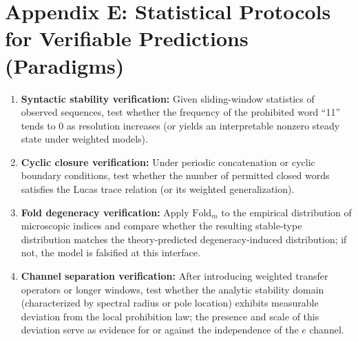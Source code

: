 \section{Appendix E: Statistical Protocols for Verifiable Predictions (Paradigms)}

\begin{enumerate}
  \item \textbf{Syntactic stability verification:} Given sliding-window statistics of observed sequences, test whether the frequency of the prohibited word ``11'' tends to $0$ as resolution increases (or yields an interpretable nonzero steady state under weighted models).
  \item \textbf{Cyclic closure verification:} Under periodic concatenation or cyclic boundary conditions, test whether the number of permitted closed words satisfies the Lucas trace relation (or its weighted generalization).
  \item \textbf{Fold degeneracy verification:} Apply $\mathrm{Fold}_m$ to the empirical distribution of microscopic indices and compare whether the resulting stable-type distribution matches the theory-predicted degeneracy-induced distribution; if not, the model is falsified at this interface.
  \item \textbf{Channel separation verification:} After introducing weighted transfer operators or longer windows, test whether the analytic stability domain (characterized by spectral radius or pole location) exhibits measurable deviation from the local prohibition law; the presence and scale of this deviation serve as evidence for or against the independence of the $e$ channel.
\end{enumerate}
